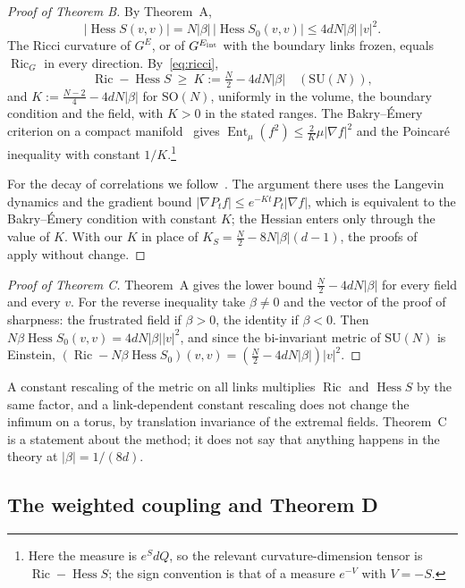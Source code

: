 \documentclass[aps,prd,twocolumn,superscriptaddress,nofootinbib,longbibliography,floatfix,amsmath,amssymb,10pt]{revtex4-2}
\theoremstyle{definition}
\theoremstyle{remark}
\newcommand{\SU}{\mathrm{SU}}
\newcommand{\SO}{\mathrm{SO}}
\newcommand{\Hess}{\operatorname{Hess}}
\newcommand{\Ric}{\operatorname{Ric}}
\begin{document}
\begin{proof}[Proof of Theorem B]
By Theorem~A,
\[
|\Hess S(v,v)|=N|\beta|\,|\Hess S_0(v,v)|\le4dN|\beta|\,|v|^2 .
\]
The Ricci curvature of $G^E$, or of $G^{E_{\rm int}}$ with the boundary links
frozen, equals $\Ric_G$ in every direction. By~\eqref{eq:ricci},
\[
\Ric-\Hess S\ \ge\ K:=\tfrac N2-4dN|\beta|\quad(\SU(N)),
\]
and $K:=\frac{N-2}4-4dN|\beta|$ for $\SO(N)$, uniformly in the volume, the
boundary condition and the field, with $K>0$ in the stated ranges. The
Bakry--\'Emery criterion on a compact manifold~\cite[Cor.~5.7.2]{BGL14} gives
$\operatorname{Ent}_\mu(f^2)\le\frac2K\mu|\nabla f|^2$ and the Poincar\'e
inequality with constant $1/K$.\footnote{Here the measure is $e^{S}dQ$, so
the relevant curvature-dimension tensor is $\Ric-\Hess S$; the sign
convention is that of a measure $e^{-V}$ with $V=-S$.}

For the decay of correlations we follow~\cite[Sec.~4]{SZZ23}. The argument
there uses the Langevin dynamics and the gradient bound
$|\nabla P_tf|\le e^{-Kt}P_t|\nabla f|$, which is equivalent to the
Bakry--\'Emery condition with constant $K$; the Hessian enters only through
the value of $K$. With our $K$ in place of $K_S=\frac N2-8N|\beta|(d-1)$, the
proofs of~\cite[Cor.~4.11 and Rem.~4.12]{SZZ23} apply without change.
\end{proof}

\begin{proof}[Proof of Theorem C]
Theorem~A gives the lower bound $\frac N2-4dN|\beta|$ for every field and
every $v$. For the reverse inequality take $\beta\ne0$ and the vector of the
proof of sharpness: the frustrated field if $\beta>0$, the identity if
$\beta<0$. Then $N\beta\Hess S_0(v,v)=4dN|\beta||v|^2$, and since the
bi-invariant metric of $\SU(N)$ is Einstein, $(\Ric-N\beta\Hess
S_0)(v,v)=(\frac N2-4dN|\beta|)|v|^2$.
\end{proof}

A constant rescaling of the metric on all links multiplies $\Ric$ and $\Hess
S$ by the same factor, and a link-dependent constant rescaling does not
change the infimum on a torus, by translation invariance of the extremal
fields. Theorem~C is a statement about the method; it does not say that
anything happens in the theory at $|\beta|=1/(8d)$.

\subsection{The weighted coupling and Theorem D}
\end{document}
